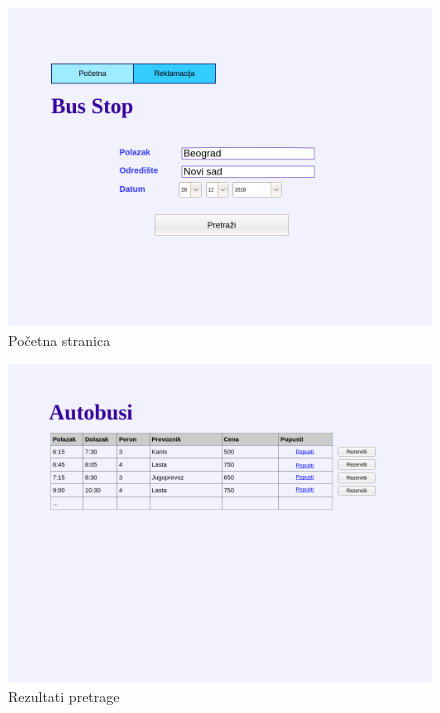 \begin{description}
\begin{figure}[h!tb] 
	\centering
	\includegraphics[width=1.2\linewidth]{../Slike/Veb/pocetna.png}
	\caption{Po\v cetna stranica}
	\label{fig:pocetna}
\end{figure}
\clearpage
\begin{figure}[h!tb] 
	\centering
	\includegraphics[width=1.2\linewidth]{../Slike/Veb/autobusi.png}
	\caption{Rezultati pretrage}
	\label{fig:pretraga}
\end{figure}


\end{description}

